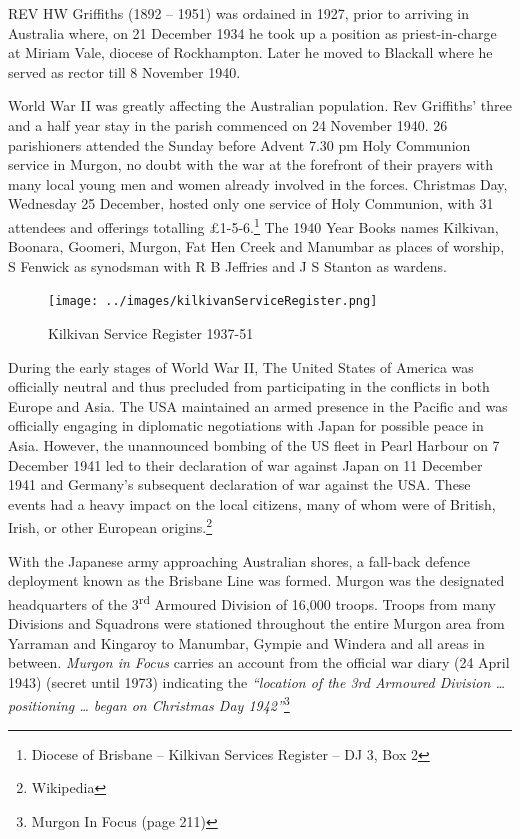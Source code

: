 \lettrine[lines=3]{R}{EV}
 HW Griffiths (1892 -- 1951) was ordained in 1927, prior to arriving in Australia where, on 21 December 1934 he took up a position as priest-in-charge at Miriam Vale, diocese of Rockhampton. Later he moved to Blackall where he served as rector till 8 November 1940.

World War II was greatly affecting the Australian population. Rev Griffiths' three and a half year stay in the parish commenced on 24 November 1940. 26 parishioners attended the Sunday before Advent 7.30 pm Holy Communion service in Murgon, no doubt with the war at the forefront of their prayers with many local young men and women already involved in the forces. Christmas Day, Wednesday 25 December, hosted only one service of Holy Communion, with 31 attendees and offerings totalling \pounds1-5-6.\footnote{Diocese of Brisbane -- Kilkivan Services Register -- DJ 3, Box 2} The 1940 Year Books names Kilkivan, Boonara, Goomeri, Murgon, Fat Hen Creek and Manumbar as places of worship, S Fenwick as synodsman with R B Jeffries and J S Stanton as wardens.








\begin{figure}
\begin{center}
\texttt{[image: ../images/kilkivanServiceRegister.png]}
\caption{Kilkivan Service Register 1937-51}
\end{center}
\end{figure}




During the early stages of World War II, The United States of America was officially neutral and thus precluded from participating in the conflicts in both Europe and Asia. The USA maintained an armed presence in the Pacific and was officially engaging in diplomatic negotiations with Japan for possible peace in Asia. However, the unannounced bombing of the US fleet in Pearl Harbour on 7 December 1941 led to their declaration of war against Japan on 11 December 1941 and Germany's subsequent declaration of war against the USA. These events had a heavy impact on the local citizens, many of whom were of British, Irish, or other European origins.\footnote{Wikipedia}


With the Japanese army approaching Australian shores, a fall-back defence deployment known as the Brisbane Line was formed. Murgon was the designated headquarters of the 3\textsuperscript{rd} Armoured Division of 16,000 troops. Troops from many Divisions and Squadrons were stationed throughout the entire Murgon area from Yarraman and Kingaroy to Manumbar, Gympie and Windera and all areas in between. \emph{Murgon in Focus} carries an account from the official war diary (24 April 1943) (secret until 1973) indicating the \emph{``location of the 3rd Armoured Division \ldots{} positioning \ldots{} began on Christmas Day 1942''}\footnote{Murgon In Focus (page 211)}


